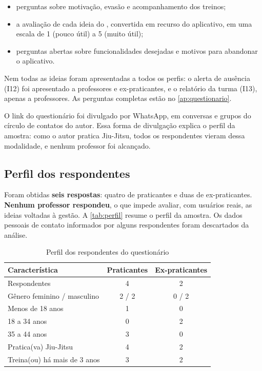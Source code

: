 \begin{itemize}
  \item perguntas sobre motivação, evasão e acompanhamento dos treinos;
  \item a avaliação de cada ideia do , convertida em
        recurso do aplicativo, em uma escala de 1 (pouco útil) a 5 (muito
        útil);
  \item perguntas abertas sobre funcionalidades desejadas e motivos para
        abandonar o aplicativo.
\end{itemize}

Nem todas as ideias foram apresentadas a todos os perfis: o alerta de
ausência (I12) foi apresentado a professores e ex-praticantes, e o
relatório da turma (I13), apenas a professores. As perguntas completas
estão no \autoref{ap:questionario}.

O link do questionário foi divulgado por WhatsApp, em conversas e grupos
do círculo de contatos do autor. Essa forma de divulgação explica o perfil
da amostra: como o autor pratica Jiu-Jitsu, todos os respondentes vieram
dessa modalidade, e nenhum professor foi alcançado.

\subsection{Perfil dos respondentes}

Foram obtidas \textbf{seis respostas}: quatro de praticantes e duas de
ex-praticantes. \textbf{Nenhum professor respondeu}, o que impede avaliar,
com usuários reais, as ideias voltadas à gestão. A \autoref{tab:perfil}
resume o perfil da amostra. Os dados pessoais de contato informados por
alguns respondentes foram descartados da análise.

\begin{table}[H]
  \centering
  \caption{Perfil dos respondentes do questionário}
  \label{tab:perfil}
  \footnotesize
  \begin{tabular}{lcc}
    \toprule
    \textbf{Característica} & \textbf{Praticantes} & \textbf{Ex-praticantes} \\
    \midrule
    Respondentes                    & 4 & 2 \\
    Gênero feminino / masculino     & 2 / 2 & 0 / 2 \\
    Menos de 18 anos                & 1 & 0 \\
    18 a 34 anos                    & 0 & 2 \\
    35 a 44 anos                    & 3 & 0 \\
    Pratica(va) Jiu-Jitsu           & 4 & 2 \\
    Treina(ou) há mais de 3 anos    & 3 & 2 \\
    \bottomrule
  \end{tabular}
\end{table}

